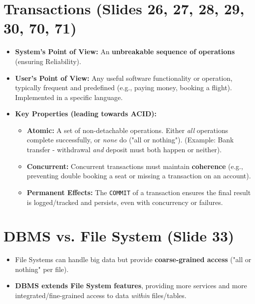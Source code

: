 \documentclass{article}
\begin{document}
	\section{Transactions (Slides 26, 27, 28, 29, 30, 70, 71)}
	\begin{itemize}
		\item \textbf{System's Point of View:} An \textbf{unbreakable sequence of operations} (ensuring Reliability).
		\item \textbf{User's Point of View:} Any useful software functionality or operation, typically frequent and predefined (e.g., paying money, booking a flight). Implemented in a specific language.
		\item \textbf{Key Properties (leading towards ACID):}
		\begin{itemize}
			\item \textbf{Atomic:} A set of non-detachable operations. Either \emph{all} operations complete successfully, or \emph{none} do ("all or nothing"). (Example: Bank transfer - withdrawal \emph{and} deposit must both happen or neither).
			\item \textbf{Concurrent:} Concurrent transactions must maintain \textbf{coherence} (e.g., preventing double booking a seat or missing a transaction on an account).
			\item \textbf{Permanent Effects:} The \texttt{COMMIT} of a transaction ensures the final result is logged/tracked and persists, even with concurrency or failures.
		\end{itemize}
	\end{itemize}
	
	\section{DBMS vs. File System (Slide 33)}
	\begin{itemize}
		\item File Systems can handle big data but provide \textbf{coarse-grained access} ("all or nothing" per file).
		\item \textbf{DBMS extends File System features}, providing more services and more integrated/fine-grained access to data \emph{within} files/tables.
	\end{itemize}
	
\end{document}
